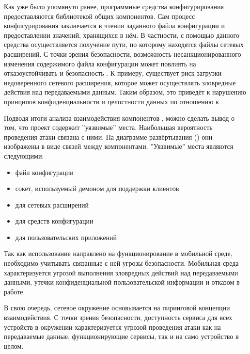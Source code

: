 %
Как уже было упомянуто ранее, программные средства конфигурирования  предоставляются библиотекой общих компонентов. 
%
Сам процесс конфигурирования заключается в чтении заданного файла конфигурации и предоставлении значений, хранящихся в нём. 
%
В частности, с помощью данного средства осуществляется получение пути, по которому находятся файлы сетевых расширений. 
%
С точки зрения безопасности, возможность несанкционированного изменения содержимого файла конфигурации может повлиять на отказоустойчивать и безопасность . 
%
К примеру, существует риск загрузки недоверенного сетевого расширения, которое может осуществлять зловредные действия над передаваемыми данным.
%
Таким образом, это приведёт к нарушению принципов конфиденциальности и целостности данных по отношению к . 

%
Подводя итоги анализа взаимодействия компонентов , можно сделать вывод о том, что проект содержит ''уязвимые'' места. Наибольшая вероятность проведения атаки связана с ними. На диаграмме развёртывания  () они изображены в виде связей между компонентами. ''Уязвимые'' места  являются следующими:
\begin{itemize}
	\setlength{\itemsep}{0pt}%

	\item файл конфигурации
	\item сокет, используемый демоном для поддержки клиентов
	\item {} для сетевых расширений
	\item {} для средств конфигурации
	\item {} для пользовательских приложений
\end{itemize}

%
Так как использование  направлено на функционирование в мобильной среде, необходимо учитывать связанные с ней угрозы безопасности. 
%
Мобильная среда характеризуется угрозой выполнения зловредных действий над передаваемыми данными, утечки конфиденциальной пользовательской информации и отказом  в работе. 

%
В свою очередь, сетевое окружение  основывается на пиринговой концепции взаимодействия. 
%
С точки зрения безопасности, доступность сервиса для всех устройств в окружении характеризуется угрозой проведения атаки как на передаваемые данные, функционирующие сервисы, так и на само устройство в целом. 

